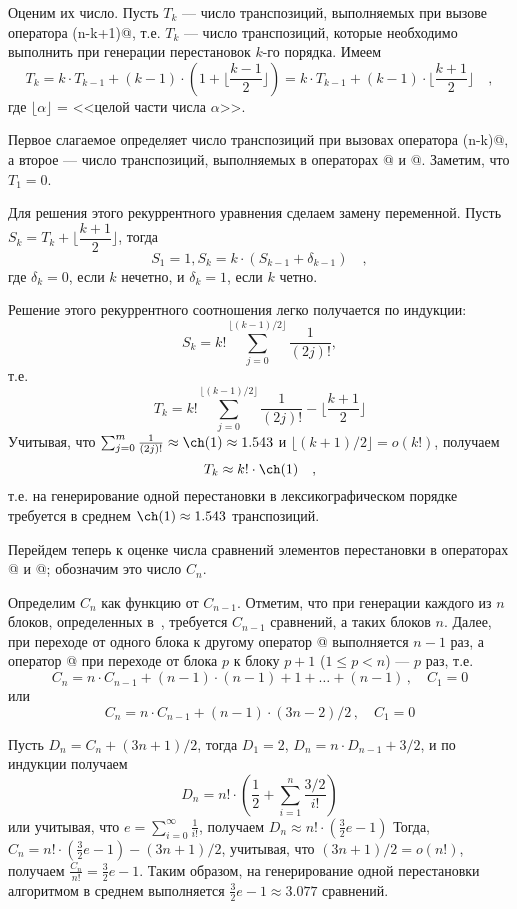 \documentclass[12pt,a4paper]{article}
\theoremstyle{plain}
\theoremstyle{definition}
\theoremstyle{remark}
\begin{document}
Оценим их число. Пусть $T_k$ --- число транспозиций, выполняемых при вызове оператора \verb@LEC(n-k+1)@, т.е. $T_k$ --- число транспозиций, которые необходимо выполнить при генерации перестановок $k$-го порядка. Имеем \[ T_k =k\cdot T_{k-1}+(k-1)\cdot(1+\lfloor\frac{k-1}{2}\rfloor)= k\cdot T_{k-1}+(k-1)\cdot\lfloor\frac{k+1}{2}\rfloor \quad,\] где $\lfloor\alpha\rfloor$ = <<целой части числа $\alpha$>>.

Первое слагаемое определяет число транспозиций при вызовах оператора \verb@LEC(n-k)@, а второе --- число транспозиций, выполняемых в операторах @ и @. Заметим, что $T_1=0$.

Для решения этого рекуррентного уравнения сделаем замену переменной. Пусть $S_k=T_k+\lfloor\dfrac{k+1}{2}\rfloor$, тогда \[ S_1=1, S_k=k\cdot(S_{k-1}+\delta_{k-1})\quad, \] где $\delta_k=0$, если $k$ нечетно, и $\delta_k=1$, если $k$ четно.

Решение этого рекуррентного соотношения легко получается по индукции: 
\[S_k = k! \sum_{j=0}^{\lfloor (k-1)/2 \rfloor} \frac{1}{(2j)!}, \] т.е. 
\[T_k = k! \sum_{j=0}^{\lfloor (k-1)/2 \rfloor} \frac{1}{(2j)!} - \lfloor \frac{k+1}{2} \rfloor \] Учитывая, что $\sum_{j=0}^{m} \frac{1}{(2j)!} \approx \ch(1) \approx 1.543$ и $\lfloor (k+1)/2 \rfloor = o(k!)$, получаем \[ T_k \approx k! \cdot \ch(1)\quad, \] т.е. на генерирование одной перестановки в лексикографическом порядке требуется в среднем $\ch(1)\approx 1.543$ транспозиций.

Перейдем теперь к оценке числа сравнений элементов перестановки в операторах @ и @; обозначим это число $C_n$.

Определим $C_n$ как функцию от $C_{n-1}$. Отметим, что при генерации каждого из $n$ блоков, определенных в~, требуется $C_{n-1}$ сравнений, а таких блоков $n$. Далее, при переходе от одного блока к другому оператор @ выполняется $n-1$ раз, а оператор @ при переходе от блока $p$ к блоку $p+1$ ($1\le p<n$) --- $p$ раз, т.е.
\[ C_n = n\cdot C_{n-1} + (n-1)\cdot(n-1)+1+\ldots+(n-1) \,,\quad C_1=0 \]
или 
\[ C_n = n\cdot C_{n-1}+(n-1)\cdot(3n-2)/2 \,,\quad C_1=0 \]

Пусть $D_n=C_n+(3n+1)/2$, тогда $D_1=2$, $D_n=n\cdot D_{n-1}+3/2$, и по индукции получаем 
\[ D_n = n! \cdot (\frac{1}{2} + \sum_{i=1}^{n} \frac{3/2}{i!}) \]
или учитывая, что $e = \sum_{i=0}^{\infty} \frac{1}{i!} $, получаем $D_n \approx n!\cdot(\frac{3}{2}e - 1)$
Тогда, $C_n = n!\cdot (\frac{3}{2}e - 1) - (3n+1)/2$, учитывая, что $(3n+1)/2 = o(n!)$, получаем $\frac{C_n}{n!} = \frac{3}{2}e - 1$. Таким образом, на генерирование одной перестановки алгоритмом \verb@LEX@ в среднем выполняется $\frac{3}{2}e-1 \approx 3.077$ сравнений.
\end{document}
